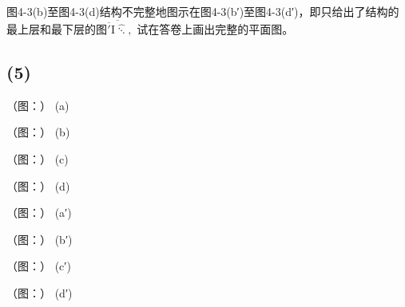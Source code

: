 图4-3(b)⾄图4-3(d)结构不完整地图⽰在图4-3(b′)⾄图4-3(d′)，即只给出了结构的最上层和最下层的图${ \overline { { \overline { { \prime } } \mathrm { { I \hat { \ddots } } } } } } ,$ 试在答卷上画出完整的平⾯图。

\subsection*{(5)}
（图：）
(a)

（图：）
(b)

（图：）
(c)

（图：）
(d)

（图：）
(a′)

（图：）
(b′)

（图：）
(c′)

（图：）
(d′)
